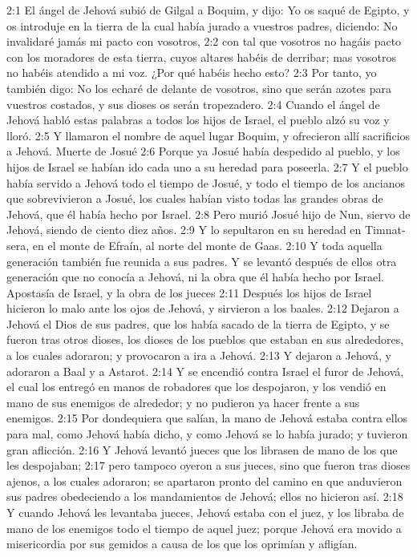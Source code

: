 2:1 El ángel de Jehová subió de Gilgal a Boquim, y dijo: Yo os saqué de Egipto, y os introduje en la tierra de la cual había jurado a vuestros padres, diciendo: No invalidaré jamás mi pacto con vosotros,  
2:2 con tal que vosotros no hagáis pacto con los moradores de esta tierra, cuyos altares habéis de derribar; mas vosotros no habéis atendido a mi voz. ¿Por qué habéis hecho esto?  
2:3 Por tanto, yo también digo: No los echaré de delante de vosotros, sino que serán azotes para vuestros costados, y sus dioses os serán tropezadero.  
2:4 Cuando el ángel de Jehová habló estas palabras a todos los hijos de Israel, el pueblo alzó su voz y lloró.  
2:5 Y llamaron el nombre de aquel lugar Boquim, y ofrecieron allí sacrificios a Jehová.  
Muerte de Josué   
2:6 Porque ya Josué había despedido al pueblo, y los hijos de Israel se habían ido cada uno a su heredad para poseerla.  
2:7 Y el pueblo había servido a Jehová todo el tiempo de Josué, y todo el tiempo de los ancianos que sobrevivieron a Josué, los cuales habían visto todas las grandes obras de Jehová, que él había hecho por Israel.  
2:8 Pero murió Josué hijo de Nun, siervo de Jehová, siendo de ciento diez años.  
2:9 Y lo sepultaron en su heredad en Timnat-sera, en el monte de Efraín, al norte del monte de Gaas.  
2:10 Y toda aquella generación también fue reunida a sus padres. Y se levantó después de ellos otra generación que no conocía a Jehová, ni la obra que él había hecho por Israel.  
Apostasía de Israel, y la obra de los jueces  
2:11 Después los hijos de Israel hicieron lo malo ante los ojos de Jehová, y sirvieron a los baales.  
2:12 Dejaron a Jehová el Dios de sus padres, que los había sacado de la tierra de Egipto, y se fueron tras otros dioses, los dioses de los pueblos que estaban en sus alrededores, a los cuales adoraron; y provocaron a ira a Jehová.  
2:13 Y dejaron a Jehová, y adoraron a Baal y a Astarot.  
2:14 Y se encendió contra Israel el furor de Jehová, el cual los entregó en manos de robadores que los despojaron, y los vendió en mano de sus enemigos de alrededor; y no pudieron ya hacer frente a sus enemigos.  
2:15 Por dondequiera que salían, la mano de Jehová estaba contra ellos para mal, como Jehová había dicho, y como Jehová se lo había jurado; y tuvieron gran aflicción.  
2:16 Y Jehová levantó jueces que los librasen de mano de los que les despojaban;  
2:17 pero tampoco oyeron a sus jueces, sino que fueron tras dioses ajenos, a los cuales adoraron; se apartaron pronto del camino en que anduvieron sus padres obedeciendo a los mandamientos de Jehová; ellos no hicieron así.  
2:18 Y cuando Jehová les levantaba jueces, Jehová estaba con el juez, y los libraba de mano de los enemigos todo el tiempo de aquel juez; porque Jehová era movido a misericordia por sus gemidos a causa de los que los oprimían y afligían. 

